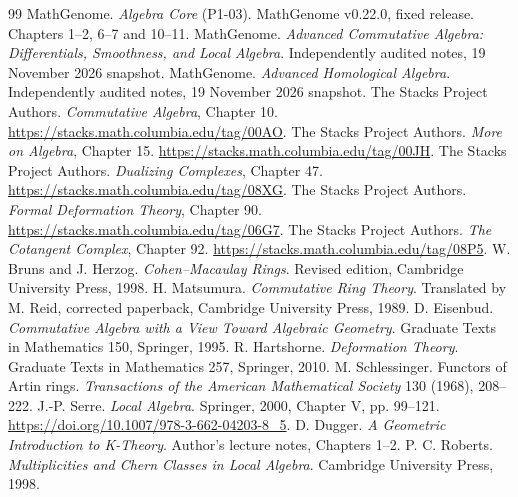 \begingroup
\small
\begin{thebibliography}{99}
\setlength{\itemsep}{0.2\baselineskip}
\setlength{\parsep}{0pt}
 MathGenome. \emph{Algebra Core} (P1-03). MathGenome v0.22.0,
  fixed release. Chapters 1--2, 6--7 and 10--11.
 MathGenome. \emph{Advanced Commutative Algebra:
  Differentials, Smoothness, and Local Algebra}. Independently audited
  notes, 19 November 2026 snapshot.
 MathGenome. \emph{Advanced Homological Algebra}.
  Independently audited notes, 19 November 2026 snapshot.
 The Stacks Project Authors. \emph{Commutative Algebra},
  Chapter 10. \url{https://stacks.math.columbia.edu/tag/00AO}.
 The Stacks Project Authors. \emph{More on Algebra},
  Chapter 15. \url{https://stacks.math.columbia.edu/tag/00JH}.
 The Stacks Project Authors. \emph{Dualizing Complexes},
  Chapter 47. \url{https://stacks.math.columbia.edu/tag/08XG}.
 The Stacks Project Authors. \emph{Formal Deformation Theory},
  Chapter 90. \url{https://stacks.math.columbia.edu/tag/06G7}.
 The Stacks Project Authors. \emph{The Cotangent Complex},
  Chapter 92. \url{https://stacks.math.columbia.edu/tag/08P5}.
 W. Bruns and J. Herzog. \emph{Cohen--Macaulay Rings}.
  Revised edition, Cambridge University Press, 1998.
 H. Matsumura. \emph{Commutative Ring Theory}.
  Translated by M. Reid, corrected paperback, Cambridge University Press, 1989.
 D. Eisenbud. \emph{Commutative Algebra with a View Toward Algebraic Geometry}.
  Graduate Texts in Mathematics 150, Springer, 1995.
 R. Hartshorne. \emph{Deformation Theory}.
  Graduate Texts in Mathematics 257, Springer, 2010.
 M. Schlessinger. Functors of Artin rings.
  \emph{Transactions of the American Mathematical Society} 130 (1968), 208--222.
 J.-P. Serre. \emph{Local Algebra}. Springer, 2000,
  Chapter V, pp. 99--121. \url{https://doi.org/10.1007/978-3-662-04203-8_5}.
 D. Dugger. \emph{A Geometric Introduction to K-Theory}.
  Author's lecture notes, Chapters 1--2.
 P. C. Roberts. \emph{Multiplicities and Chern Classes in
  Local Algebra}. Cambridge University Press, 1998.
\end{thebibliography}
\endgroup
